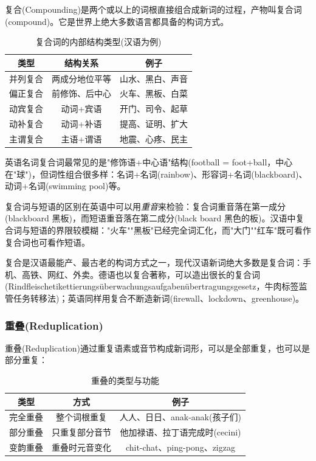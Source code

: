 复合(Compounding)是两个或以上的词根直接组合成新词的过程，产物叫复合词(compound)。它是世界上绝大多数语言都具备的构词方式。

\begin{table}[H]
\centering
\caption{复合词的内部结构类型(汉语为例)}
\begin{tabulary}{\textwidth}{@{}CCC@{}}
\toprule
\textbf{类型} & \textbf{结构关系} & \textbf{例子} \\
\midrule
并列复合 & 两成分地位平等 & 山水、黑白、声音 \\
偏正复合 & 前修饰、后中心 & 火车、黑板、白菜 \\
动宾复合 & 动词+宾语 & 开门、司令、起草 \\
动补复合 & 动词+补语 & 提高、证明、扩大 \\
主谓复合 & 主语+谓语 & 地震、心疼、民主 \\
\bottomrule
\end{tabulary}
\end{table}

英语名词复合词最常见的是"修饰语+中心语"结构(football = foot+ball，中心在"球")，但词性组合很多样：名词+名词(rainbow)、形容词+名词(blackboard)、动词+名词(swimming pool)等。

复合词与短语的区别在英语中可以用\emph{重音}来检验：复合词重音落在第一成分(blackboard 黑板)，而短语重音落在第二成分(black board 黑色的板)。汉语中复合词与短语的界限较模糊："火车""黑板"已经完全词汇化，而"大门""红车"既可看作复合词也可看作短语。

复合是汉语最能产、最古老的构词方式之一，现代汉语新词绝大多数是复合词：手机、高铁、网红、外卖。德语也以复合著称，可以造出很长的复合词(Rindfleischetikettierungsüberwachungsaufgabenübertragungsgesetz，牛肉标签监管任务转移法)；英语同样用复合不断造新词(firewall、lockdown、greenhouse)。

\subsubsection{重叠(Reduplication)}

重叠(Reduplication)通过重复语素或音节构成新词形，可以是全部重复，也可以是部分重复：

\begin{table}[H]
\centering
\caption{重叠的类型与功能}
\begin{tabulary}{\textwidth}{@{}CCC@{}}
\toprule
\textbf{类型} & \textbf{方式} & \textbf{例子} \\
\midrule
完全重叠 & 整个词根重复 & 人人、日日、anak-anak(孩子们) \\
部分重叠 & 只重复部分音节 & 他加禄语、拉丁语完成时(cecini) \\
变韵重叠 & 重叠时元音变化 & chit-chat、ping-pong、zigzag \\
\bottomrule
\end{tabulary}
\end{table}

